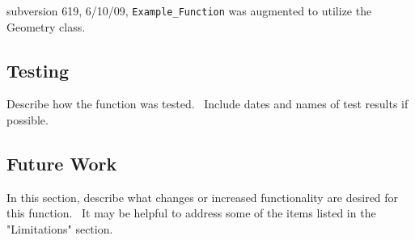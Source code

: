 \documentclass[12pt]{article}%
\begin{document}
subversion 619, 6/10/09, \texttt{Example\_Function} was augmented to utilize
the Geometry class.

\subsection*{Testing}

Describe how the function was tested. \ Include dates and names of test
results if possible.

\subsection*{Future Work}

In this section, describe what changes or increased functionality are desired
for this function. \ It may be helpful to address some of the items listed in
the "Limitations" section.
\end{document}
